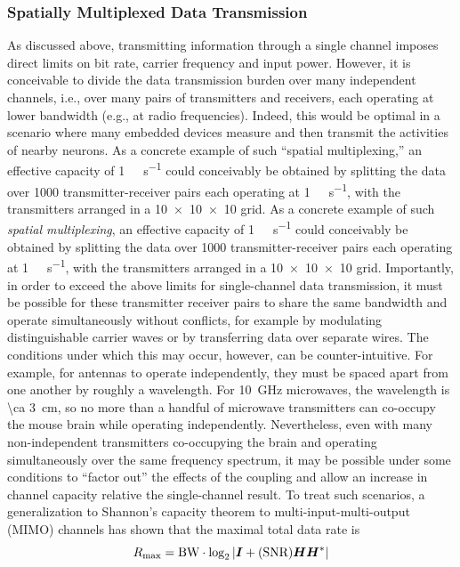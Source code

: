\subsubsection{Spatially Multiplexed Data Transmission}

As discussed above, transmitting information through a single channel imposes direct limits on bit rate, carrier frequency and input power.
However, it is conceivable to divide the data transmission burden over many independent channels, i.e., over many pairs of transmitters and receivers, each operating at lower bandwidth (e.g., at radio frequencies).
Indeed, this would be optimal in a scenario where many embedded devices measure and then transmit the activities of nearby neurons.
As a concrete example of such ``spatial multiplexing,'' an effective capacity of \SI{1}{\tera\bit\per\second} could conceivably be obtained by splitting the data over \num{1000} transmitter-receiver pairs each operating at \SI{1}{\giga\bit\per\second}, with the transmitters arranged in a \num{10 x 10 x 10} grid.
As a concrete example of such \emph{spatial multiplexing}, an effective capacity of \SI{1}{\tera\bit\per\second} could conceivably be obtained by splitting the data over \num{1000} transmitter-receiver pairs each operating at \SI{1}{\giga\bit\per\second}, with the transmitters arranged in a \num{10 x 10 x 10} grid. %
Importantly, in order to exceed the above limits for single-channel data transmission, it must be possible for these transmitter receiver pairs to share the same bandwidth and operate simultaneously without conflicts, for example by modulating distinguishable carrier waves or by transferring data over separate wires.
The conditions under which this may occur, however, can be counter-intuitive.
For example, for antennas to operate independently, they must be spaced apart from one another by roughly a wavelength.
For \SI{10}{\giga\hertz} microwaves, the wavelength is \SI{\ca 3}{\centi\meter}, so no more than a handful of microwave transmitters can co-occupy the mouse brain while operating independently.
Nevertheless, even with many non-independent transmitters co-occupying the brain and operating simultaneously over the same frequency spectrum, it may be possible under some conditions to ``factor out'' the effects of the coupling and allow an increase in channel capacity relative the single-channel result.
To treat such scenarios, a generalization to Shannon's capacity theorem to multi-input-multi-output (MIMO) channels has shown that the maximal total data rate is
\[R\sub{max} = \BW \cdot \log_2\left| \mat{I} + ( \SNR ) \mat{H}\mat{H}^* \right|\]
